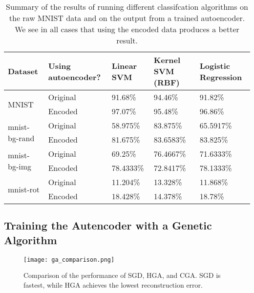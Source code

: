 \begin{table}[h]
	\centering
\begin{tabular}{ll|lll}
    Dataset                        & Using autoencoder? & Linear SVM & Kernel SVM (RBF) & Logistic Regression \\ \hline
    \multirow{2}{*}{MNIST}         & Original           & 91.68\%    & 94.46\%          & 91.82\%             \\
                                   & Encoded            & 97.07\%    & 95.48\%          & 96.86\%             \\ \hline
    \multirow{2}{*}{mnist-bg-rand} & Original           & 58.975\%   & 83.875\%         & 65.5917\%           \\
                                   & Encoded            & 81.675\%   & 83.6583\%        & 83.825\%            \\ \hline
    \multirow{2}{*}{mnist-bg-img}  & Original           & 69.25\%    & 76.4667\%        & 71.6333\%           \\
                                   & Encoded            & 78.4333\%  & 72.8417\%        & 78.1333\%           \\ \hline
    \multirow{2}{*}{mnist-rot}     & Original           & 11.204\%   & 13.328\%         & 11.868\%           \\
                                   & Encoded            & 18.428\%   & 14.378\%         & 18.78\%
\end{tabular}
	\label{tab:classvsenc}
	\caption{Summary of the results of running different classifcation algorithms on the raw MNIST data and on the output from a trained autoencoder. We
	see in all cases that using the encoded data produces a better result.}
\end{table}

\subsection{Training the Autencoder with a Genetic Algorithm}

\begin{figure}[h] \centering
	\texttt{[image: ga\_comparison.png]}
	\caption{Comparison of the performance of SGD, HGA, and CGA. SGD is fastest, while HGA achieves the lowest reconstruction error.}
	\label{fig:ga_comparison}
\end{figure}

